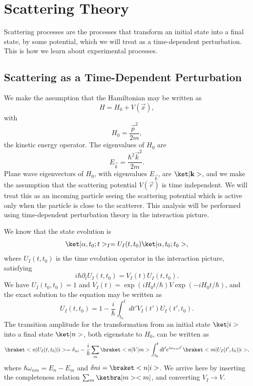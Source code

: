 \section{Scattering Theory}
Scattering processes are the processes that transform an initial state into a final state, by some potential, which we will treat as a time-dependent perturbation. This is how we learn about experimental processes.

\subsection{Scattering as a Time-Dependent Perturbation}
We make the assumption that the Hamiltonian may be written as
\begin{equation}
    H = H_0 + V(\vec{x}),
\end{equation}
with
\begin{equation}
    H_0 = \frac{\vec{p}^2}{2m},
\end{equation}
the kinetic energy operator. The eigenvalues of $H_0$ are 
\begin{equation}
    E_{\vec{k}} = \frac{\hbar^2 \vec{k}^2}{2m}.
\end{equation}
Plane wave eigenvectors of $H_0$, with eigenvalues $E_{\vec{k}}$, are $\k{\vec{k}}$, and we make the assumption that the scattering potential $V(\vec{r})$ is time independent. We will treat this as an incoming particle seeing the scattering potential which is active only when the particle is close to the scatterer. This analysis will be performed using time-dependent perturbation theory in the interaction picture.

We know that the state evolution is
\begin{equation}
    \k{\alpha, t_0; t}_I = U_I(t,t_0)\k{\alpha, t_0;t_0},
\end{equation}
where $U_I(t,t_0)$ is the time evolution operator in the interaction picture, satisfying
\begin{equation}
    i\hbar \partial_t U_I(t,t_0) = V_I(t)U_I(t,t_0).
\end{equation}
We have $U_I(t_0,t_0) = 1$ and $V_I(t)=\exp(iH_0t/\hbar) V \exp(-iH_0t/\hbar)$, and the exact solution to the equation may be written as
\begin{equation}
    U_I(t,t_0) = 1 - \frac{i}{\hbar}\int_{t_0}^t dt' V_I(t')U_I(t',t_0).
\end{equation}
The transition amplitude for the transformation from an initial state $\k{i}$ into a final state $\k{n}$, both eigenstate to $H_0$, can be written as 
\begin{equation}
    \bkop{n}{U_I(t,t_0)}{i} = \delta_{ni} - \frac{i}{\hbar} \sum_m \bkop{n}{V}{m} \int_{t_0}^{t} dt' e^{i \omega_{nm} t'} \bkop{m}{U_I(t',t_0)}{i},
\end{equation}
where $\hbar\omega_{nm} = E_n - E_m$ and $\delta{ni}=\bk{n}{i}$. We arrive here by inserting the completeness relation $\sum_m \kb{m}{m}$, and converting $V_I \to V$. 

